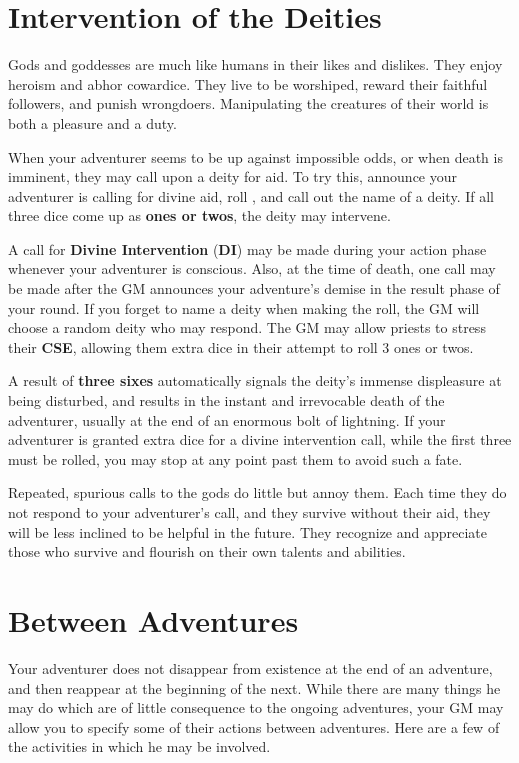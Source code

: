 \begin{multicols*}{2}
\section{Intervention of the Deities}
Gods and goddesses are much like humans in their likes and dislikes. They enjoy heroism and abhor cowardice. They live to be worshiped, reward their faithful followers,
and punish wrongdoers. Manipulating the creatures of their world is both a pleasure and a duty.

When your adventurer seems to be up against impossible odds, or when death is imminent, they may call upon a deity for aid. To try this, announce your adventurer is calling for divine aid, roll , and call out the name of a deity. If all three dice come up as \textbf{ones or twos}, the deity may intervene.

A call for \textbf{Divine Intervention} (\textbf{DI}) may be made
during your action phase whenever your adventurer is conscious. Also, at the time of death, one call may be made after the GM announces your adventure's demise in the result phase of your round. If you forget to name a deity when making the roll, the GM will choose a random deity who may respond. The GM may allow priests to stress their \textbf{CSE}, allowing them extra dice in their attempt to roll 3 ones or twos.

A result of \textbf{three sixes} automatically signals the deity's immense displeasure at being disturbed, and results in the instant and irrevocable death of the adventurer, usually at the end of an enormous bolt of lightning. If your adventurer is granted extra dice for a divine intervention call, while the first three must be rolled, you may stop at any point past them to avoid such a fate.

Repeated, spurious calls to the gods do little but annoy them. Each time they do not respond to your adventurer's call, and they survive without their aid, they will be less inclined to be helpful in the future. They recognize and appreciate those who survive and flourish on their own talents and abilities.
\section{Between Adventures}
Your adventurer does not disappear from existence at the end of an adventure, and then reappear at the beginning of the next. While there are many things he may do which are of little consequence to the ongoing adventures, your GM may allow you to specify some of their actions between adventures. Here are a few of the activities in which he may
be involved.

\end{multicols*}
